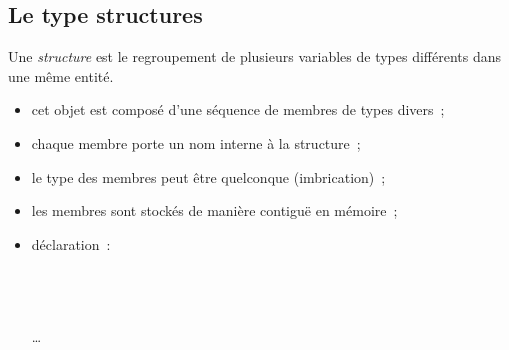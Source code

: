 \begin{frame}
  \section{Le type structures} 
  Une \textit{structure} est le regroupement de plusieurs variables de
  types diff\'erents dans une m\^eme entit\'e.
  \begin{itemize}
  \item cet objet est compos\'e d'une s\'equence de membres de types divers~;
  \item chaque membre porte un nom interne \`a la structure~;
  \item le type des membres peut \^etre quelconque (imbrication)~;
  \item les membres sont stock\'es de mani\`ere contigu\"e en m\'emoire~;
  \item d\'eclaration~:\\
    \;
    \par\quad {\tt \{}\\
    \;{\tt ;}\\
    \;{\tt ;}\\
    \qquad \ldots\\
    \quad {\tt \};}
  \end{itemize}
\end{frame}
